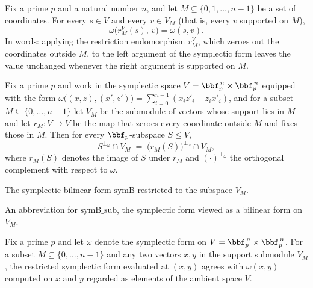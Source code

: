\begin{lemma}
\label{sym_form_left_restrict}
\leanok
{}
Fix a prime $p$ and a natural number $n$, and let $M \subseteq \{0,1,\dots,n-1\}$ be a
set of coordinates. For every $s \in V$ and every $v \in V_M$ (that is, every $v$
supported on $M$),
\[
\omega\bigl(r_M^V(s),\, v\bigr) = \omega(s, v).
\]
In words: applying the restriction endomorphism $r_M^V$, which zeroes out the
coordinates outside $M$, to the left argument of the symplectic form leaves the value
unchanged whenever the right argument is supported on $M$.
\end{lemma}

\begin{lemma}
\label{orth_inter_eq_orth_map}
\leanok
{}
Fix a prime $p$ and work in the symplectic space $V = \bbf_p^{\,n} \times \bbf_p^{\,n}$
equipped with the form $\omega\big((x,z),(x',z')\big) = \sum_{i=0}^{n-1}(x_i z'_i - z_i
x'_i)$, and for a subset $M \subseteq \{0,\dots,n-1\}$ let $V_M$ be the submodule of
vectors whose support lies in $M$ and let $r_M \colon V \to V$ be the map that zeroes
every coordinate outside $M$ and fixes those in $M$. Then for every $\bbf_p$-subspace $S
\le V$,
\[
S^{\perp_\omega} \cap V_M \;=\; \big(r_M(S)\big)^{\perp_\omega} \cap V_M,
\]
where $r_M(S)$ denotes the image of $S$ under $r_M$ and $(\cdot)^{\perp_\omega}$ the
orthogonal complement with respect to $\omega$.
\end{lemma}

\begin{definition}
\label{symB_sub}
\leanok
{}
The symplectic bilinear form $\mathrm{symB}$ restricted to the subspace $V_M$.
\end{definition}

\begin{definition}
\label{sym_form_sub}
\leanok
{}
An abbreviation for $\mathrm{symB\_sub}$, the symplectic form viewed as a bilinear form on $V_M$.
\end{definition}

\begin{lemma}
\label{sym_form_sub_apply}
\leanok
{}
Fix a prime $p$ and let $\omega$ denote the symplectic form on $V = \bbf_p^{\,n} \times
\bbf_p^{\,n}$. For a subset $M \subseteq \{0, \dots, n-1\}$ and any two vectors $x, y$
in the support submodule $V_M$, the restricted symplectic form evaluated at $(x, y)$
agrees with $\omega(x, y)$ computed on $x$ and $y$ regarded as elements of the ambient
space $V$.
\end{lemma}

